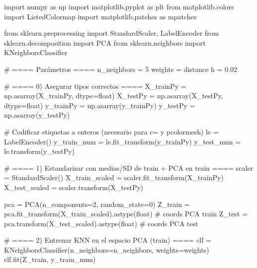 \documentclass[
  letterpaper,
  DIV=11,
  numbers=noendperiod]{scrartcl}
\newenvironment{Shaded}{\begin{snugshade}}{\end{snugshade}}
\newcommand{\BuiltInTok}[1]{\textcolor[rgb]{0.00,0.23,0.31}{#1}}
\newcommand{\CommentTok}[1]{\textcolor[rgb]{0.37,0.37,0.37}{#1}}
\newcommand{\DecValTok}[1]{\textcolor[rgb]{0.68,0.00,0.00}{#1}}
\newcommand{\FloatTok}[1]{\textcolor[rgb]{0.68,0.00,0.00}{#1}}
\newcommand{\ImportTok}[1]{\textcolor[rgb]{0.00,0.46,0.62}{#1}}
\newcommand{\NormalTok}[1]{\textcolor[rgb]{0.00,0.23,0.31}{#1}}
\newcommand{\OperatorTok}[1]{\textcolor[rgb]{0.37,0.37,0.37}{#1}}
\newcommand{\StringTok}[1]{\textcolor[rgb]{0.13,0.47,0.30}{#1}}
\begin{document}
\begin{Shaded}
\begin{Highlighting}[]
\ImportTok{import}\NormalTok{ numpy }\ImportTok{as}\NormalTok{ np}
\ImportTok{import}\NormalTok{ matplotlib.pyplot }\ImportTok{as}\NormalTok{ plt}
\ImportTok{from}\NormalTok{ matplotlib.colors }\ImportTok{import}\NormalTok{ ListedColormap}
\ImportTok{import}\NormalTok{ matplotlib.patches }\ImportTok{as}\NormalTok{ mpatches}

\ImportTok{from}\NormalTok{ sklearn.preprocessing }\ImportTok{import}\NormalTok{ StandardScaler, LabelEncoder}
\ImportTok{from}\NormalTok{ sklearn.decomposition }\ImportTok{import}\NormalTok{ PCA}
\ImportTok{from}\NormalTok{ sklearn.neighbors }\ImportTok{import}\NormalTok{ KNeighborsClassifier}

\CommentTok{\# ==== Parámetros ====}
\NormalTok{n\_neighbors }\OperatorTok{=} \DecValTok{5}
\NormalTok{weights }\OperatorTok{=} \StringTok{\textquotesingle{}distance\textquotesingle{}}
\NormalTok{h }\OperatorTok{=} \FloatTok{0.02}

\CommentTok{\# ==== 0) Asegurar tipos correctos ====}
\NormalTok{X\_trainPy }\OperatorTok{=}\NormalTok{ np.asarray(X\_trainPy, dtype}\OperatorTok{=}\BuiltInTok{float}\NormalTok{)}
\NormalTok{X\_testPy  }\OperatorTok{=}\NormalTok{ np.asarray(X\_testPy,  dtype}\OperatorTok{=}\BuiltInTok{float}\NormalTok{)}
\NormalTok{y\_trainPy }\OperatorTok{=}\NormalTok{ np.asarray(y\_trainPy)}
\NormalTok{y\_testPy  }\OperatorTok{=}\NormalTok{ np.asarray(y\_testPy)}

\CommentTok{\# Codificar etiquetas a enteros (necesario para c= y pcolormesh)}
\NormalTok{le }\OperatorTok{=}\NormalTok{ LabelEncoder()}
\NormalTok{y\_train\_num }\OperatorTok{=}\NormalTok{ le.fit\_transform(y\_trainPy)}
\NormalTok{y\_test\_num  }\OperatorTok{=}\NormalTok{ le.transform(y\_testPy)}

\CommentTok{\# ==== 1) Estandarizar con medias/SD de train + PCA en train ====}
\NormalTok{scaler }\OperatorTok{=}\NormalTok{ StandardScaler()}
\NormalTok{X\_train\_scaled }\OperatorTok{=}\NormalTok{ scaler.fit\_transform(X\_trainPy)}
\NormalTok{X\_test\_scaled  }\OperatorTok{=}\NormalTok{ scaler.transform(X\_testPy)}

\NormalTok{pca }\OperatorTok{=}\NormalTok{ PCA(n\_components}\OperatorTok{=}\DecValTok{2}\NormalTok{, random\_state}\OperatorTok{=}\DecValTok{0}\NormalTok{)}
\NormalTok{Z\_train }\OperatorTok{=}\NormalTok{ pca.fit\_transform(X\_train\_scaled).astype(}\BuiltInTok{float}\NormalTok{)   }\CommentTok{\# coords PCA train}
\NormalTok{Z\_test  }\OperatorTok{=}\NormalTok{ pca.transform(X\_test\_scaled).astype(}\BuiltInTok{float}\NormalTok{)        }\CommentTok{\# coords PCA test}

\CommentTok{\# ==== 2) Entrenar KNN en el espacio PCA (train) ====}
\NormalTok{clf }\OperatorTok{=}\NormalTok{ KNeighborsClassifier(n\_neighbors}\OperatorTok{=}\NormalTok{n\_neighbors, weights}\OperatorTok{=}\NormalTok{weights)}
\NormalTok{clf.fit(Z\_train, y\_train\_num)}
\end{Highlighting}
\end{Shaded}
\end{document}
